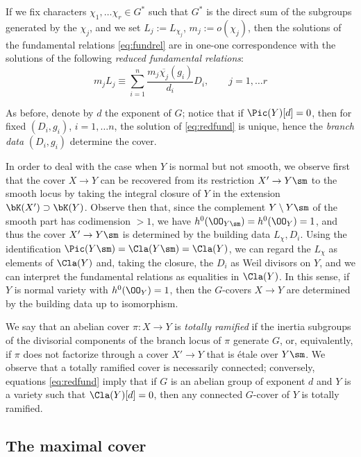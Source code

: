 \documentclass[10pt]{amsart}
\numberwithin{equation}{section}
\begin{document}
If we fix characters $\chi_1,\dots \chi_r\in G^*$ such that $G^*$ is the direct sum of the subgroups generated by the $\chi_j$, and we set $L_j:=L_{\chi_j}$, $m_j:=o(\chi_j)$, then the solutions of the fundamental relations \eqref{eq:fundrel} are in one-one correspondence with the solutions of the following {\em reduced fundamental relations}:
\begin{equation} \label{eq:redfund}
m_jL_j\equiv \sum _{i=1}^n\frac{m_j \overline{\chi_j}(g_i)}{d_i}D_i, \qquad j=1,\dots r
\end{equation}


As before, denote by $d$ the exponent of $G$; notice that if  $\Pic(Y)[d]=0$, then for fixed $(D_i, g_i)$, $i=1,\dots n$, the solution of \eqref{eq:redfund} is unique, hence the {\em branch data} $(D_i, g_i)$ determine the cover.
\bigskip


In order to deal with the case when $Y$ is normal but not smooth,  we
observe first that the cover $X\to Y$ can be recovered from  its
restriction $X'\to  Y\sm$ to the smooth locus by taking the integral
closure of $Y$ in the extension  $\bK(X')\supset \bK(Y)$.
Observe then that, since   the complement $Y\setminus Y\sm$ of the smooth part has
codimension $>1$,  we have   $h^0(\OO_{Y\sm})=h^0(\OO_Y)=1$, and thus
  the cover $X'\to Y\sm$ is determined by the building data
$L_{\chi}, D_i$. Using the identification
$\Pic(Y\sm)=\Cla(Y\sm)=\Cla(Y)$, 
we can  regard the $L_{\chi}$ as elements  of $\Cla(Y)$ and, taking the closure, the $D_i$ as Weil divisors on $Y$, and we can interpret the fundamental relations as equalities in $\Cla(Y)$. In this sense, if $Y$ is normal variety with $h^0(\OO_Y)=1$, then the  $G$-covers $X\to Y$ are determined by the building data up to isomorphism.
\bigskip


We say that an abelian cover $\pi\colon X\to Y$ is {\em totally ramified} if  the inertia subgroups of the divisorial components of the branch locus of $\pi$ generate $G$, or, equivalently, if $\pi$ does not factorize through a cover $X'\to Y$ that is \'etale over $Y\sm$. We observe that a totally ramified cover is necessarily connected; conversely, equations \eqref{eq:redfund} imply that if $G$ is an abelian group of exponent $d$ and $Y$ is a variety such that  $\Cla(Y)[d]=0$, then any connected $G$-cover  of $Y$ is totally ramified.


\subsection{The maximal cover}\label{ssec:maxcover}
\end{document}
